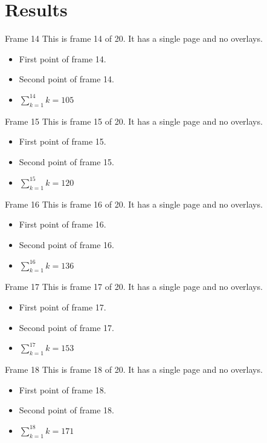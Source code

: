 \documentclass[aspectratio=169]{beamer}
\begin{document}
\section{Results}
\begin{frame}{Frame 14}
  This is frame 14 of 20. It has a single page and no overlays.
  \begin{itemize}
    \item First point of frame 14.
    \item Second point of frame 14.
    \item $\sum_{k=1}^{14} k = 105$
  \end{itemize}
\end{frame}
\begin{frame}{Frame 15}
  This is frame 15 of 20. It has a single page and no overlays.
  \begin{itemize}
    \item First point of frame 15.
    \item Second point of frame 15.
    \item $\sum_{k=1}^{15} k = 120$
  \end{itemize}
\end{frame}
\begin{frame}{Frame 16}
  This is frame 16 of 20. It has a single page and no overlays.
  \begin{itemize}
    \item First point of frame 16.
    \item Second point of frame 16.
    \item $\sum_{k=1}^{16} k = 136$
  \end{itemize}
\end{frame}
\begin{frame}{Frame 17}
  This is frame 17 of 20. It has a single page and no overlays.
  \begin{itemize}
    \item First point of frame 17.
    \item Second point of frame 17.
    \item $\sum_{k=1}^{17} k = 153$
  \end{itemize}
\end{frame}
\begin{frame}{Frame 18}
  This is frame 18 of 20. It has a single page and no overlays.
  \begin{itemize}
    \item First point of frame 18.
    \item Second point of frame 18.
    \item $\sum_{k=1}^{18} k = 171$
  \end{itemize}
\end{frame}
\end{document}
